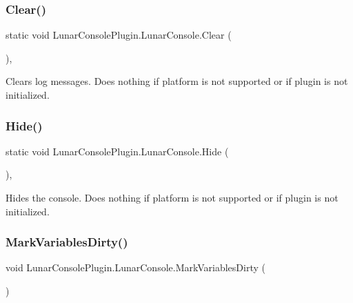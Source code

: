\subsubsection{\texorpdfstring{Clear()}{Clear()}}
{\footnotesize\ttfamily static void Lunar\+Console\+Plugin.\+Lunar\+Console.\+Clear (\begin{DoxyParamCaption}{ }\end{DoxyParamCaption})\hspace{0.3cm}{\ttfamily [inline]}, {\ttfamily [static]}}



Clears log messages. Does nothing if platform is not supported or if plugin is not initialized. 

\mbox{\label{class_lunar_console_plugin_1_1_lunar_console_a90d09a226f1abc6ea1d1bd3c3f884127}} 
\subsubsection{\texorpdfstring{Hide()}{Hide()}}
{\footnotesize\ttfamily static void Lunar\+Console\+Plugin.\+Lunar\+Console.\+Hide (\begin{DoxyParamCaption}{ }\end{DoxyParamCaption})\hspace{0.3cm}{\ttfamily [inline]}, {\ttfamily [static]}}



Hides the console. Does nothing if platform is not supported or if plugin is not initialized. 

\mbox{\label{class_lunar_console_plugin_1_1_lunar_console_ae51760319ad0c8d63c50e62e45497395}} 
\subsubsection{\texorpdfstring{Mark\+Variables\+Dirty()}{MarkVariablesDirty()}}
{\footnotesize\ttfamily void Lunar\+Console\+Plugin.\+Lunar\+Console.\+Mark\+Variables\+Dirty (\begin{DoxyParamCaption}{ }\end{DoxyParamCaption})\hspace{0.3cm}{\ttfamily [inline]}}



